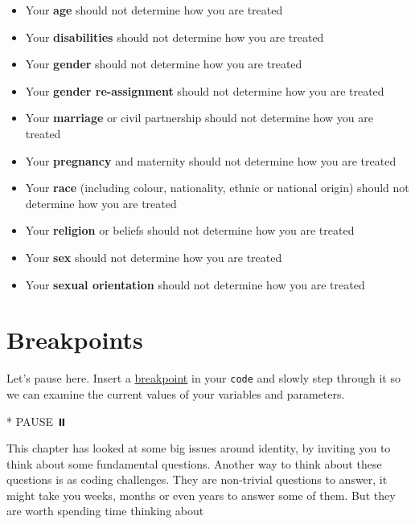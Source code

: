 \documentclass[
]{book}
\newenvironment{Shaded}{\begin{snugshade}}{\end{snugshade}}
\newcommand{\NormalTok}[1]{#1}
\newcommand{\SpecialStringTok}[1]{\textcolor[rgb]{0.31,0.60,0.02}{#1}}
\providecommand{\tightlist}{%
  \setlength{\itemsep}{0pt}\setlength{\parskip}{0pt}}
\begin{document}
\begin{itemize}
\tightlist
\item
  Your \textbf{age} should not determine how you are treated
\item
  Your \textbf{disabilities} should not determine how you are treated
\item
  Your \textbf{gender} should not determine how you are treated \citep{inferior, damore, damoreguardian, everydaysexism}
\item
  Your \textbf{gender re-assignment} should not determine how you are treated
\item
  Your \textbf{marriage} or civil partnership should not determine how you are treated
\item
  Your \textbf{pregnancy} and maternity should not determine how you are treated
\item
  Your \textbf{race} (including colour, nationality, ethnic or national origin) should not determine how you are treated \citep{nottalking, superior}
\item
  Your \textbf{religion} or beliefs should not determine how you are treated
\item
  Your \textbf{sex} should not determine how you are treated \citep{harassment}
\item
  Your \textbf{sexual orientation} should not determine how you are treated \citep{nosex}
\end{itemize}

\hypertarget{bp2}{%
\section{Breakpoints}\label{bp2}}

Let's pause here. Insert a \href{https://en.wikipedia.org/wiki/Breakpoint}{breakpoint} in your \texttt{code} and slowly step through it so we can examine the current values of your variables and parameters.

\begin{Shaded}
\begin{Highlighting}[]
\SpecialStringTok{* }\NormalTok{PAUSE ⏸️}
\end{Highlighting}
\end{Shaded}

This chapter has looked at some big issues around identity, by inviting you to think about some fundamental questions. Another way to think about these questions is as coding challenges. They are non-trivial questions to answer, it might take you weeks, months or even years to answer some of them. But they are worth spending time thinking about
\end{document}
